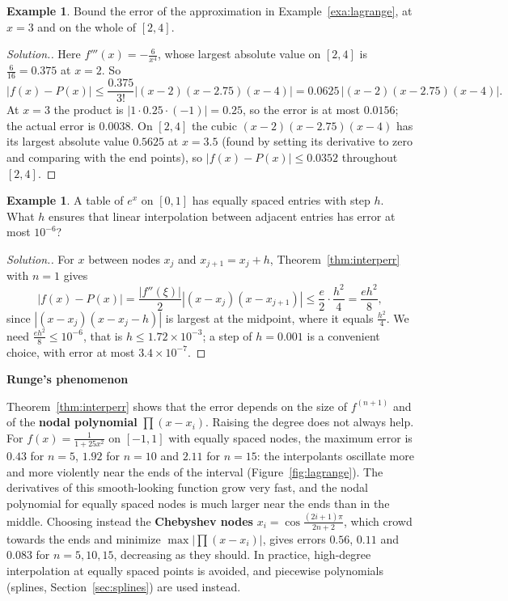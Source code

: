 \documentclass[11pt,a4paper]{article}
\numberwithin{equation}{section}
\theoremstyle{definition}
\newtheorem{exa}[thm]{Example}
\newenvironment{solution}
  {\renewcommand{\qedsymbol}{}\begin{proof}[\textit{Solution}.]}
  {\end{proof}}
\newcommand{\subhead}[1]{%
  \par\medskip\noindent\textbf{#1}\par\nobreak\smallskip}
\begin{document}
\begin{exa}
\label{exa:interperr}
Bound the error of the approximation in Example~\ref{exa:lagrange}, at $x = 3$ and on the whole of $[2,4]$.
\end{exa}

\begin{solution}
Here $f'''(x) = -\frac{6}{x^4}$, whose largest absolute value on $[2,4]$ is $\frac6{16} = 0.375$ at $x = 2$. So
$$|f(x)-P(x)|\leq\frac{0.375}{3!}|(x-2)(x-2.75)(x-4)| = 0.0625\,|(x-2)(x-2.75)(x-4)| .$$
At $x = 3$ the product is $|1\cdot0.25\cdot(-1)| = 0.25$, so the error is at most $0.0156$; the actual error is $0.0038$. On $[2,4]$ the
cubic $(x-2)(x-2.75)(x-4)$ has its largest absolute value $0.5625$ at $x = 3.5$ (found by setting its derivative to zero and comparing with
the end points), so $|f(x)-P(x)|\leq0.0352$ throughout $[2,4]$.
\end{solution}

\begin{exa}
\label{exa:tablestep}
A table of $e^x$ on $[0,1]$ has equally spaced entries with step $h$. What $h$ ensures that linear interpolation between adjacent entries
has error at most $10^{-6}$?
\end{exa}

\begin{solution}
For $x$ between nodes $x_j$ and $x_{j+1} = x_j+h$, Theorem~\ref{thm:interperr} with $n = 1$ gives
$$|f(x)-P(x)| = \frac{|f''(\xi)|}{2}|(x-x_j)(x-x_{j+1})|\leq\frac{e}{2}\cdot\frac{h^2}{4} = \frac{eh^2}{8},$$
since $|(x-x_j)(x-x_j-h)|$ is largest at the midpoint, where it equals $\frac{h^2}4$. We need $\frac{eh^2}{8}\leq10^{-6}$, that is
$h\leq1.72\times10^{-3}$; a step of $h = 0.001$ is a convenient choice, with error at most $3.4\times10^{-7}$.
\end{solution}

\subhead{Runge's phenomenon}
Theorem~\ref{thm:interperr} shows that the error depends on the size of $f^{(n+1)}$ and of the \textbf{nodal polynomial}
$\prod(x-x_i)$. Raising the degree does not always help. For $f(x) = \frac1{1+25x^2}$ on $[-1,1]$ with equally spaced nodes, the maximum
error is $0.43$ for $n = 5$, $1.92$ for $n = 10$ and $2.11$ for $n = 15$: the interpolants oscillate more and more violently near the ends
of the interval (Figure~\ref{fig:lagrange}). The derivatives of this smooth-looking function grow very fast, and the nodal polynomial for
equally spaced nodes is much larger near the ends than in the middle. Choosing instead the \textbf{Chebyshev nodes}
$x_i = \cos\frac{(2i+1)\pi}{2n+2}$, which crowd towards the ends and minimize $\max|\prod(x-x_i)|$, gives errors $0.56$, $0.11$ and $0.083$
for $n = 5, 10, 15$, decreasing as they should. In practice, high-degree interpolation at equally spaced points is avoided, and piecewise
polynomials (splines, Section~\ref{sec:splines}) are used instead.
\end{document}
